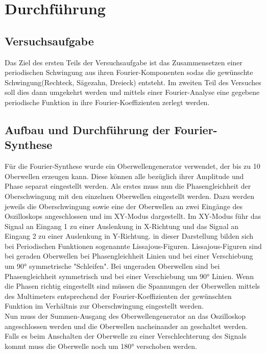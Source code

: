 \section{Durchführung}
\label{sec:Durchführung}
\subsection{Versuchsaufgabe}
Das Ziel des ersten Teils der Versuchsaufgabe ist das Zusammensetzen einer
periodischen Schwingung aus ihren Fourier-Komponenten sodas die gewünschte
Schwingung(Rechteck, Sägezahn, Dreieck) entsteht. Im zweiten Teil des Versuches
soll dies dann umgekehrt werden und mittels einer Fourier-Analyse eine gegebene
periodische Funktion in ihre Fourier-Koeffizienten zerlegt werden.
\subsection{Aufbau und Durchführung der Fourier-Synthese}
Für die Fourier-Synthese wurde ein Oberwellengenerator verwendet, der bis zu 10
Oberwellen erzeugen kann. Diese können alle bezüglich ihrer Amplitude und Phase
separat eingestellt werden. Als erstes muss nun die Phasengleichheit der
Oberschwingung mit den einzelnen Oberwellen eingestellt werden. Dazu werden
jeweils die Oberschwingung sowie eine der Oberwellen an zwei Eingänge des
Oszilloskops angeschlossen und im XY-Modus dargestellt. Im XY-Modus führ das
Signal an Eingang 1 zu einer Auslenkung in X-Richtung und das Signal an Eingang
2 zu einer Auslenkung in Y-Richtung. in dieser Darstellung bilden sich bei
Periodischen Funktionen sogenannte Lissajous-Figuren\cite{V351}.
Lissajous-Figuren sind bei geraden Oberwellen bei Phasengleichheit Linien und
bei einer Verschiebung um 90° symmetrische "Schleifen". Bei ungeraden
Oberwellen sind bei Phasengleichheit symmetrisch und bei einer Verschiebung um
90° Linien. Wenn die Phasen richtig eingestellt sind müssen die Spannungen der
Oberwellen mittels des Multimeters entsprechend der Fourier-Koeffizienten der
gewünschten Funktion im Verhältnis zur Oberschwingung eingestellt werden.\\ Nun
muss der Summen-Ausgang des Oberwellengenerator an das Oszilloskop
angeschlossen werden und die Oberwellen nacheinander an geschaltet werden.
Falls es beim Anschalten der Oberwelle zu einer Verschlechterung des Signals
kommt muss die Oberwelle noch um 180° verschoben werden.

